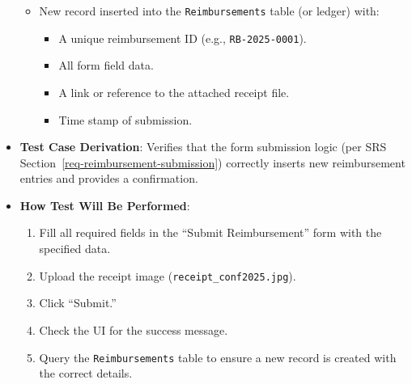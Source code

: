 \documentclass[12pt, titlepage]{article}
\begin{document}
\begin{itemize}
\begin{itemize}
        \item New record inserted into the \texttt{Reimbursements} table (or ledger) with:
        \begin{itemize}
            \item A unique reimbursement ID (e.g., \texttt{RB-2025-0001}).
            \item All form field data.
            \item A link or reference to the attached receipt file.
            \item Time stamp of submission.
        \end{itemize}
    \end{itemize}
    \item \textbf{Test Case Derivation}: 
    Verifies that the form submission logic (per SRS Section~\ref{req-reimbursement-submission}) correctly inserts new reimbursement entries and provides a confirmation.
    \item \textbf{How Test Will Be Performed}:
    \begin{enumerate}
        \item Fill all required fields in the ``Submit Reimbursement'' form with the specified data.
        \item Upload the receipt image (\texttt{receipt\_conf2025.jpg}).
        \item Click ``Submit.'' 
        \item Check the UI for the success message.
        \item Query the \texttt{Reimbursements} table to ensure a new record is created with the correct details.
    \end{enumerate}
\end{itemize}
\end{document}
